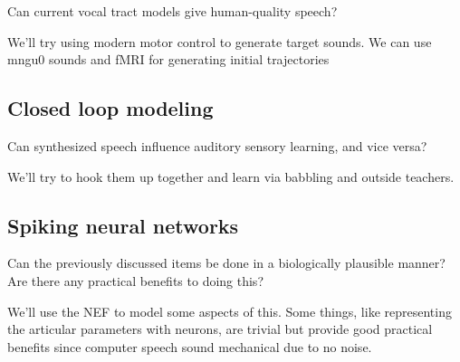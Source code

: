\documentclass{article}
\begin{document}
Can current vocal tract models give human-quality speech?

We'll try using modern motor control to generate target sounds.
We can use mngu0 sounds and fMRI for generating initial trajectories

\subsection{Closed loop modeling}

Can synthesized speech
influence auditory sensory learning,
and vice versa?

We'll try to hook them up together
and learn via babbling and outside teachers.

\subsection{Spiking neural networks}

Can the previously discussed items
be done in a biologically plausible manner?
Are there any practical benefits to doing this?

We'll use the NEF to model some aspects of this.
Some things,
like representing the articular parameters with neurons,
are trivial but provide good practical benefits
since computer speech sound mechanical due to no noise.
\end{document}
